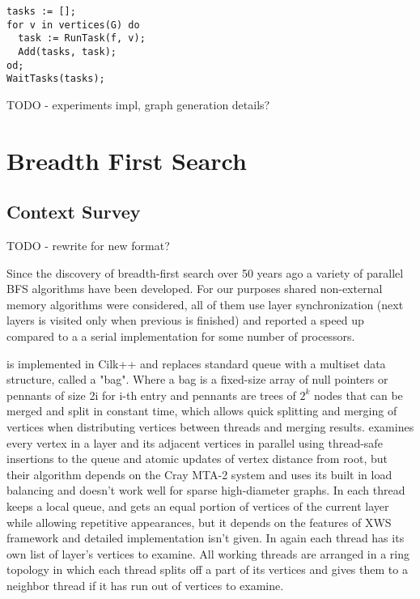 \documentclass{report}
\theoremstyle{plain}
\theoremstyle{definition}
\theoremstyle{remark}
\begin{document}
\begin{lstlisting}
tasks := [];
for v in vertices(G) do
  task := RunTask(f, v);
  Add(tasks, task);
od;
WaitTasks(tasks);
\end{lstlisting}

TODO - experiments impl, graph generation details?

\chapter{Breadth First Search}

\section{Context Survey}

TODO - rewrite for new format?

Since the discovery of breadth-first search over 50 years ago a variety of parallel BFS algorithms have been developed. For our purposes shared non-external memory algorithms \cite{Leiserson, bader2006designing, cong2008solving, zhang2006parallel} were considered, all of them use layer synchronization (next layers is visited only when previous is finished) and reported a speed up compared to a a serial implementation for some number of processors.

\cite{Leiserson} is implemented in Cilk++ and replaces standard queue with a multiset data structure, called a "bag". Where a bag is a fixed-size array of null pointers or pennants of size 2i for i-th entry and pennants are trees of $2^k$ nodes that can be merged and split in constant time, which allows quick splitting and merging of vertices when distributing vertices between threads and merging results.
\cite{bader2006designing} examines every vertex in a layer and its adjacent vertices in parallel using thread-safe insertions to the queue and atomic updates of vertex distance from root, but their algorithm depends on the Cray MTA-2 system and uses its built in load balancing and doesn't work well for sparse high-diameter graphs.
In \cite{cong2008solving} each thread keeps a local queue, and gets an equal portion of vertices of the current layer while allowing repetitive appearances, but it depends on the features of XWS framework and detailed implementation isn't given.
In \cite{zhang2006parallel} again each thread has its own list of layer's vertices to examine. All working threads are arranged in a ring topology in which each thread splits off a part of its vertices and gives them to a neighbor thread if it has run out of vertices to examine.
\end{document}
